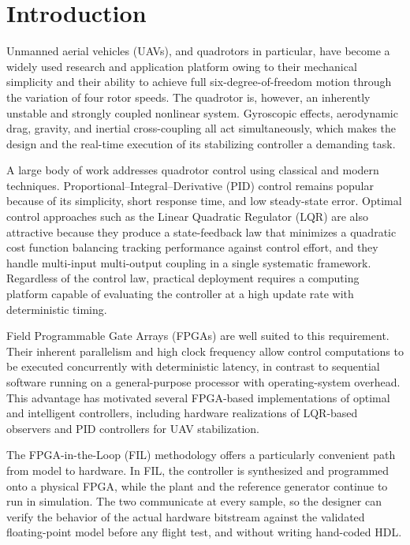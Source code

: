 \documentclass[conference]{IEEEtran}
\begin{document}
\section{Introduction}
Unmanned aerial vehicles (UAVs), and quadrotors in particular, have become a widely used research and application platform owing to their mechanical simplicity and their ability to achieve full six-degree-of-freedom motion through the variation of four rotor speeds. The quadrotor is, however, an inherently unstable and strongly coupled nonlinear system. Gyroscopic effects, aerodynamic drag, gravity, and inertial cross-coupling all act simultaneously, which makes the design and the real-time execution of its stabilizing controller a demanding task.

A large body of work addresses quadrotor control using classical and modern techniques. Proportional--Integral--Derivative (PID) control remains popular because of its simplicity, short response time, and low steady-state error. Optimal control approaches such as the Linear Quadratic Regulator (LQR) are also attractive because they produce a state-feedback law that minimizes a quadratic cost function balancing tracking performance against control effort, and they handle multi-input multi-output coupling in a single systematic framework. Regardless of the control law, practical deployment requires a computing platform capable of evaluating the controller at a high update rate with deterministic timing.

Field Programmable Gate Arrays (FPGAs) are well suited to this requirement. Their inherent parallelism and high clock frequency allow control computations to be executed concurrently with deterministic latency, in contrast to sequential software running on a general-purpose processor with operating-system overhead. This advantage has motivated several FPGA-based implementations of optimal and intelligent controllers, including hardware realizations of LQR-based observers and PID controllers for UAV stabilization.

The FPGA-in-the-Loop (FIL) methodology offers a particularly convenient path from model to hardware. In FIL, the controller is synthesized and programmed onto a physical FPGA, while the plant and the reference generator continue to run in simulation. The two communicate at every sample, so the designer can verify the behavior of the actual hardware bitstream against the validated floating-point model before any flight test, and without writing hand-coded HDL.
\end{document}
